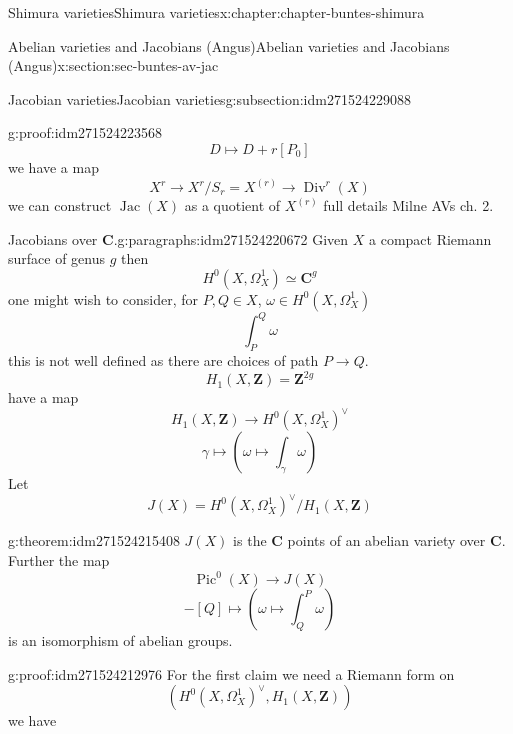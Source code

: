 \documentclass[oneside,10pt,]{book}
\numberwithin{equation}{section}
\newcommand{\ZZ}{\mathbf{Z}}
\newcommand{\CC}{\mathbf{C}}
\DeclareMathOperator{\divisors}{Div}
\DeclareMathOperator{\Pic}{Pic}
\DeclareMathOperator{\Jac}{Jac}
\begin{document}
\begin{chapterptx}{Shimura varieties}{}{Shimura varieties}{}{}{x:chapter:chapter-buntes-shimura}
\begin{sectionptx}{Abelian varieties and Jacobians (Angus)}{}{Abelian varieties and Jacobians (Angus)}{}{}{x:section:sec-buntes-av-jac}
\begin{subsectionptx}{Jacobian varieties}{}{Jacobian varieties}{}{}{g:subsection:idm271524229088}
\begin{proofptx}{}{g:proof:idm271524223568}
%
\begin{equation*}
D \mapsto D + r[P_0]
\end{equation*}
we have  a map%
\begin{equation*}
X^r \to X^r/ S_r = X^{(r)} \to \divisors^r(X)
\end{equation*}
we can construct \(\Jac(X)\) as a quotient of \(X^{(r)}\) full details Milne AVs ch. 2.%
\end{proofptx}
\begin{paragraphs}{Jacobians over \(\CC\).}{g:paragraphs:idm271524220672}%
Given \(X\) a compact Riemann surface of genus \(g\) then%
\begin{equation*}
H^0(X, \Omega_X^1) \simeq \CC^g
\end{equation*}
one might wish to consider, for \(P,Q \in X\), \(\omega\in H^0(X, \Omega_X^1)\)%
\begin{equation*}
\int_P^Q \omega
\end{equation*}
this is not well defined as there are choices of path \(P\to Q\).%
\begin{equation*}
H_1(X,\ZZ) = \ZZ^{2g}
\end{equation*}
have  a map%
\begin{equation*}
H_1(X,\ZZ) \to H^0(X, \Omega_X^1) ^\vee
\end{equation*}
%
\begin{equation*}
\gamma \mapsto (\omega \mapsto \int_\gamma \omega)
\end{equation*}
Let%
\begin{equation*}
J(X) = H^0(X, \Omega_X^1) ^\vee/H_1(X,\ZZ)
\end{equation*}
%
\begin{theorem}{}{}{g:theorem:idm271524215408}%
\(J(X) \) is the \(\CC\) points of an abelian variety over \(\CC\). Further the map%
\begin{equation*}
\Pic^0(X) \to J(X)
\end{equation*}
%
\begin{equation*}
[P] - [Q] \mapsto (\omega \mapsto \int^P_Q \omega)
\end{equation*}
is an isomorphism of abelian groups.%
\end{theorem}
\begin{proofptx}{}{g:proof:idm271524212976}
For the first claim we need a Riemann form on%
\begin{equation*}
(H^0(X, \Omega_X^1)^\vee , H_1(X,\ZZ))
\end{equation*}
we have%
\begin{equation*}

\end{equation*}
\end{proofptx}
\end{paragraphs}
\end{subsectionptx}
\end{sectionptx}
\end{chapterptx}
\end{document}
